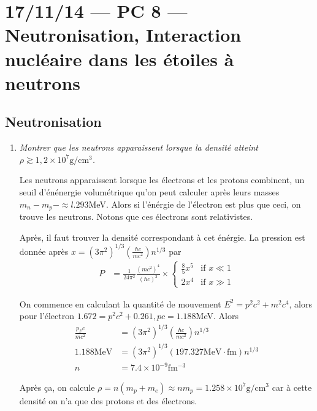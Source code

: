 \documentclass[10pt]{report}
\newcommand{\scinot}[2]{#1\times 10^{#2}}
\begin{document}
\chapter{17/11/14 --- PC 8 --- Neutronisation, Interaction nucl\'eaire dans les \'etoiles \`a neutrons}

\section{Neutronisation}

\begin{enumerate}[1.]
    \item \emph{Montrer que les neutrons apparaissent lorsque la densit\'e atteint $\rho \gtrsim 1,2 \times 10^{7}\mathrm{g/cm^3}$.}

        Les neutrons apparaissent lorsque les \'electrons et les protons combinent, un seuil d'\'en\'energie volum\'etrique qu'on peut calculer apr\`es leurs masses $m_n - m_p - \approx l.293$MeV. Alors si l'\'en\'ergie de l'\'electron est plus que ceci, on trouve les neutrons. Notons que ces \'electrons sont relativistes.

        Apr\`es, il faut trouver la densit\'e correspondant \`a cet \'en\'ergie. La pression est donn\'ee apr\`es $x = \left( 3\pi^2 \right)^{1/3}\left( \frac{\hbar c}{mc^2} \right)n^{1/3}$ par
        \begin{align}
            P &= \frac{1}{24 \pi^2} \frac{(mc^2)^4}{(\hbar c)^3} \times
            \begin{cases}
                \frac{8}{5}x^5 & \mbox{if } x \ll 1\\
                2x^4 & \mbox{if } x \gg 1
            \end{cases}
        \end{align}

        On commence en calculant la quantit\'e de mouvement $E^2 = p^2c^2 + m^2c^4$, alors pour l'\'electron $1.672 = p^2c^2 + 0.261, pc = 1.188$MeV. Alors
        \begin{align}
            \frac{p_Fc}{mc^2}  &= \left( 3\pi^2 \right)^{1/3}\left( \frac{\hbar c}{mc^2} \right)n^{1/3}\\
            1.188 \mathrm{MeV} &= \left( 3\pi^2 \right)^{1/3}\left( 197.327\mathrm{MeV \cdot fm} \right)n^{1/3}\\
            n &= \scinot{7.4}{-9}\mathrm{fm^{-3}}
        \end{align}

        Apr\`es \c{c}a, on calcule $\rho = n\left( m_p + m_e \right) \approx nm_p = 1.258 \times 10^7 \mathrm{g/cm^3}$ car \`a cette densit\'e on n'a que des protons et des \'electrons.


\end{enumerate}
\end{document}
